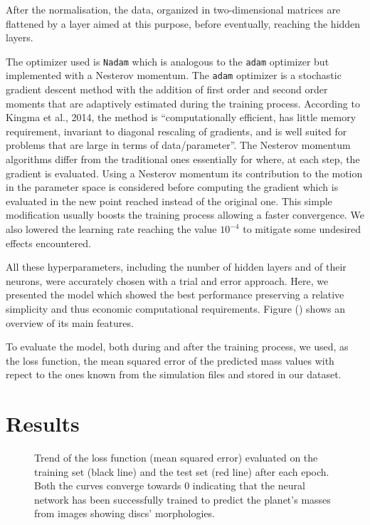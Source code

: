 \documentclass[a4paper,10pt]{report}
\begin{document}
After the normalisation, the data, organized in two-dimensional matrices are flattened by a layer aimed at this purpose, before
eventually, reaching the hidden layers.

The optimizer used is \lstinline{Nadam} which is analogous to the \lstinline{adam} optimizer but implemented with a Nesterov momentum.
The \lstinline{adam} optimizer is a stochastic gradient descent method with the addition of first order and second order moments
that are adaptively estimated during the training process. According to
 Kingma et al., 2014, 
 the method is ``computationally efficient, has little memory requirement, 
 invariant to diagonal rescaling of gradients, 
 and is well suited for problems that are large in terms of data/parameter''.
The Nesterov momentum algorithms differ from the traditional ones essentially for where, at each step, the gradient is evaluated.
Using a Nesterov momentum its contribution to the motion in the parameter space is considered before computing the gradient 
which is evaluated in the new point reached instead of the original one. This simple modification usually boosts the training process allowing
a faster convergence.
We also lowered the learning rate reaching the value $10^{-4}$ to mitigate some undesired effects encountered.

All these hyperparameters, including the number of hidden layers and of their neurons, were accurately chosen
with a trial and error approach. Here, we presented the model which showed the best performance preserving a relative simplicity
and thus economic computational requirements. 
Figure () shows an overview of its main features.

To evaluate the model, both during and after the training process, we used, as the loss function, the mean squared error of the predicted mass values 
with repect to the ones known from the simulation files and stored in our dataset.

\section{Results}

\begin{figure}
    \begin{center}
        
    \end{center}
    \caption{Trend of the loss function (mean squared error) 
    evaluated on the training set (black line) and the test set (red line)
    after each epoch. Both the curves converge towards 0
    indicating that the neural network has been successfully trained to predict the planet's masses 
    from images showing discs' morphologies. }
\end{figure}
\end{document}
